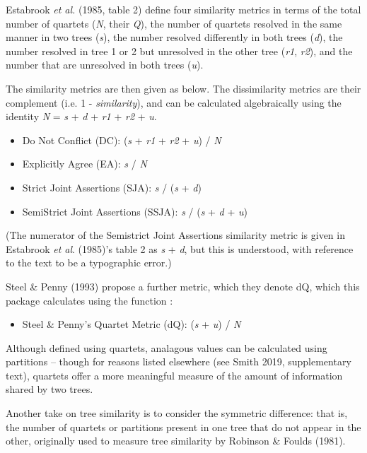 \documentclass[a4paper]{book}
\begin{document}
\begin{Details}\relax
Estabrook \emph{et al.} (1985, table 2) define four similarity metrics in terms of the
total number of quartets (\emph{N}, their \emph{Q}), the number of quartets resolved in the same
manner in two trees (\emph{s}), the number resolved differently in both trees
(\emph{d}), the number resolved in tree 1 or 2 but unresolved in the other tree
(\emph{r1}, \emph{r2}), and the number that are unresolved in both trees (\emph{u}).

The similarity metrics are then given as below.  The dissimilarity metrics
are their complement (i.e. 1 - \emph{similarity}), and can be calculated
algebraically using the identity \emph{N} = \emph{s} + \emph{d} + \emph{r1} + \emph{r2} + \emph{u}.
\begin{itemize}

\item Do Not Conflict (DC): (\emph{s} + \emph{r1} + \emph{r2} + \emph{u}) / \emph{N}
\item Explicitly Agree (EA): \emph{s} / \emph{N}
\item Strict Joint Assertions (SJA): \emph{s} / (\emph{s} + \emph{d})
\item SemiStrict Joint Assertions (SSJA): \emph{s} / (\emph{s} + \emph{d} + \emph{u})

\end{itemize}


(The numerator of the Semistrict Joint Assertions similarity metric is given in
Estabrook \emph{et al}. (1985)'s table 2 as \emph{s} + \emph{d}, but this is understood, with
reference to the text to be a typographic error.)

Steel \& Penny (1993) propose a further metric, which they denote dQ,
which this package calculates using the function :
\begin{itemize}

\item Steel \& Penny's Quartet Metric (dQ): (\emph{s} + \emph{u}) / \emph{N}

\end{itemize}


Although defined using quartets, analagous values can be calculated using partitions
-- though for reasons listed elsewhere (see Smith 2019, supplementary text),
quartets offer a more meaningful measure of the amount of information
shared by two trees.

Another take on tree similarity is to consider the symmetric difference: that is,
the number of quartets or partitions present in one tree that do not appear in the
other, originally used to measure tree similarity by Robinson \& Foulds (1981).
\begin{itemize}


\end{itemize}
\end{Details}
\end{document}
